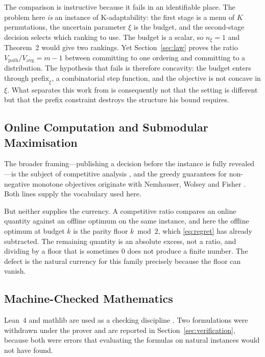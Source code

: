 The comparison is instructive because it fails in an identifiable place. The problem here
\emph{is} an instance of K-adaptability: the first stage is a menu of $K$ permutations, the
uncertain parameter $\xi$ is the budget, and the second-stage decision selects which ranking
to use. The budget is a scalar, so $n_{\xi}=1$ and Theorem~2 would give two rankings. Yet
Section~\ref{sec:law} proves the ratio $V_{\mathrm{path}}/V_{\mathrm{avg}}=m-1$ between
committing to one ordering and committing to a distribution. The hypothesis that fails is
therefore concavity: the budget enters through $\mathrm{prefix}_{\xi}$, a combinatorial step
function, and the objective is not concave in $\xi$. What separates this work from
\cite{kurtz2026} is consequently not that the setting is different but that the prefix
constraint destroys the structure his bound requires.

\subsection{Online Computation and Submodular Maximisation}

The broader framing---publishing a decision before the instance is fully revealed---is the
subject of competitive analysis \cite{borodin1998}, and the greedy guarantees for
non-negative monotone objectives originate with Nemhauser, Wolsey and Fisher
\cite{nemhauser1978}. Both lines supply the vocabulary used here.

But neither supplies the currency. A competitive ratio compares an online quantity against an
offline optimum on the same instance, and here the offline optimum at budget $k$ is the
parity floor $k\bmod2$, which \eqref{eq:regret} has already subtracted. The remaining
quantity is an absolute excess, not a ratio, and dividing by a floor that is sometimes $0$
does not produce a finite number. The defect is the natural currency for this family
precisely because the floor can vanish.

\subsection{Machine-Checked Mathematics}

Lean~4 and mathlib are used as a checking discipline \cite{demoura2021,mathlib2020}. Two
formulations were withdrawn under the prover and are reported in
Section~\ref{sec:verification}, because both were errors that evaluating the formulas on
natural instances would not have found.

